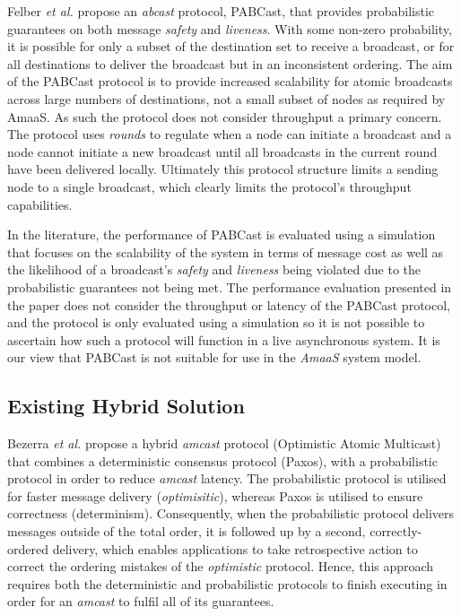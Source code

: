     Felber \emph{et al.} \citep{Felber01probabilisticatomic} propose an \emph{abcast} protocol, \textsf{PABCast}, that provides probabilistic guarantees on both message \emph{safety} and \emph{liveness}.  With some non-zero probability, it is possible for only a subset of the destination set to receive a broadcast, or for all destinations to deliver the broadcast but in an inconsistent ordering.  The aim of the  \textsf{PABCast} protocol is to provide increased scalability for atomic broadcasts across large numbers of destinations, not a small subset of nodes as required by \textsf{AmaaS}.  As such the protocol does not consider throughput a primary concern.  The protocol uses \emph{rounds} to regulate when a node can initiate a broadcast and a node cannot initiate a new broadcast until all broadcasts in the current round have been delivered locally.  Ultimately this protocol structure limits a sending node to a single broadcast, which clearly limits the protocol's throughput capabilities.  
    
    In the literature, the performance of \textsf{PABCast} is evaluated using a simulation that focuses on the scalability of the system in terms of message cost as well as the likelihood of a broadcast's \emph{safety} and \emph{liveness} being violated due to the probabilistic guarantees not being met. The performance evaluation presented in the paper does not consider the throughput or latency of the \textsf{PABCast} protocol, and the protocol is only evaluated using a simulation so it is not possible to ascertain how such a protocol will function in a live asynchronous system.  It is our view that \textsf{PABCast} is not suitable for use in the \emph{AmaaS} system model.  
    
    
    \subsection{Existing Hybrid Solution}
    Bezerra \emph{et al.}\citep{6681607} propose a hybrid \emph{amcast} protocol (Optimistic Atomic Multicast) that combines a deterministic consensus protocol (Paxos), with a probabilistic protocol in order to reduce \emph{amcast} latency.  The probabilistic protocol is utilised for faster message delivery (\emph{optimisitic}), whereas Paxos is utilised to ensure correctness (determinism).  Consequently, when the probabilistic protocol delivers messages outside of the total order, it is followed up by a second, correctly-ordered delivery, which enables applications to take retrospective action to correct the ordering mistakes of the \emph{optimistic} protocol.  Hence, this approach requires both the deterministic and probabilistic protocols to finish executing in order for an \emph{amcast} to fulfil all of its guarantees. 
    
